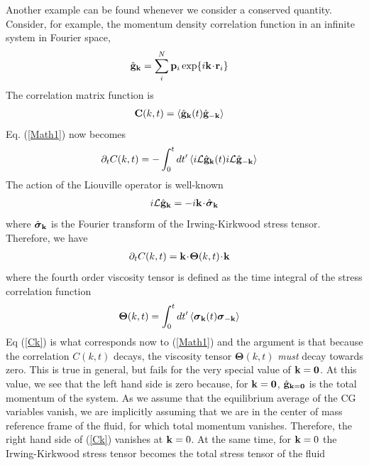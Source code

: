 \documentclass[b5paper,openright,11pt]{book}
\newcommand{\esc}{\!\cdot\!}
\newcommand{\llangle}{\left\langle}
\newcommand{\rrangle}{\right\rangle}
\begin{document}
{Another example  can be  found whenever  we consider  a
conserved  quantity.  Consider,  for  example,  the  momentum  density
correlation function in an infinite system in Fourier space,
\begin{align}
\hat{\bf g}_{\bf k}&=\sum_i^N{\bf p}_i\exp\{i{\bf k}\esc{\bf r}_i\}
\end{align}
The correlation matrix function is
\begin{align}
  {\bf C}(k,t)&=\llangle \hat{\bf g}_{\bf k}(t)\hat{\bf g}_{-{\bf k}}\rrangle
\end{align}
Eq. (\ref{Math1}) now becomes
\begin{align}
\partial_t  C(k,t)&=-\int_0^tdt'\llangle i{\cal L} \hat{\bf g}_{\bf k}(t) i{\cal L}\hat{\bf g}_{-{\bf k}}\rrangle
\end{align}
The action of the Liouville operator is well-known
\begin{align}
  i{\cal L}\hat{\bf g}_{\bf k}=-i{\bf k}\esc\hat{\boldsymbol{\sigma}}_{\bf k}
\end{align}
where $\hat{\boldsymbol{\sigma}}_{\bf k}$ is the Fourier transform of the Irwing-Kirkwood
stress tensor.  Therefore, we have
\begin{align}
\partial_t  C(k,t)&={\bf k}\esc\boldsymbol{\Theta}(k,t)\esc {\bf k}
\label{Ck}
\end{align}
where the fourth order viscosity tensor is defined as the time integral of the
stress correlation function
\begin{align}
\boldsymbol{\Theta}(k,t)&=  \int_0^tdt'\llangle \boldsymbol{\sigma}_{\bf k}(t) \boldsymbol{\sigma}_{-{\bf k}}\rrangle
\label{Theta}
\end{align}
Eq  (\ref{Ck})  is  what  corresponds now  to  (\ref{Math1})  and  the
argument  is  that  because   the  correlation  $C(k,t)$  decays,  the
viscosity   tensor   $\boldsymbol{\Theta}(k,t)$  \textit{must}   decay
towards zero.   This is  true in  general, but  fails for  the very special
value of ${\bf k}={\bf 0}$.  At this  value, we see that the left hand
side is zero because, for ${\bf k}={\bf 0}$, $\hat{\bf g}_{{\bf k}=\bf 0}$ is
the total momentum  of the system.  As we assume  that the equilibrium
average of the CG variables vanish, we are implicitly assuming that we
are in  the center  of mass  reference frame of  the fluid,  for which
total momentum vanishes.  Therefore, the right hand  side of (\ref{Ck})
vanishes at  ${\bf k}=0$.  At the same time, for  ${\bf k}=0$  the Irwing-Kirkwood
stress tensor becomes the total stress tensor of the fluid
\begin{align}

\end{align}}
\end{document}
